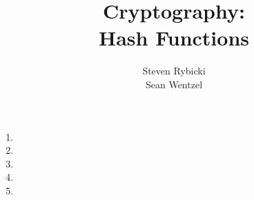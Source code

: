\documentclass[12pt,a4paper]{article}
\title{{\bf Cryptography:}\\
Hash Functions}
\author{Steven Rybicki\\
Sean Wentzel}
\begin{document}
\maketitle
\begin{enumerate}
\item 
\item 
\item 
\item 
\item 
\end{enumerate}
\end{document}
